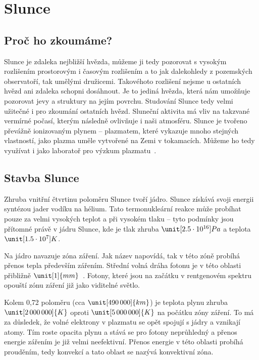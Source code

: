 \chapter{Slunce}

\section{Proč ho zkoumáme?}
Slunce je zdaleka nejbližší hvězda, můžeme ji tedy pozorovat s vysokým rozlišením prostorovým i časovým rozlišením a to jak dalekohledy z pozemských observatoří, tak umělými družicemi. Takovéhoto rozlišení nejsme u ostatních hvězd ani zdaleka schopni dosáhnout. Je to jediná hvězda, která nám umožňuje pozorovat jevy a struktury na jejím povrchu. Studování Slunce tedy velmi užitečné i pro zkoumání ostatních hvězd. Sluneční aktivita má vliv na takzvané vermírné počasí, kterým následně ovlivňuje i naši atmosféru.  Slunce je tvořeno převážně ionizovaným plynem – plazmatem, které vykazuje mnoho stejných vlastností, jako plazma uměle vytvořené na Zemi v tokamacích. Můžeme ho tedy využívat i jako laboratoř pro výzkum plazmatu~\cite{nasa_whysolar}.

\section{Stavba Slunce}
Zhruba vnitřní čtvrtinu poloměru Slunce tvoří jádro. Slunce získává svoji energii syntézou jader vodíku na hélium. Tato termonukleární reakce může probíhat pouze za velmi vysokých teplot a při vysokém tlaku – tyto podmínky jsou přítomné právě v jádru Slunce, kde je tlak zhruba $\unit[2.5\cdot10^{16}]{Pa}$ a teplota $\unit[1.5\cdot10^{7}]{K}$.

Na jádro navazuje zóna záření. Jak název napovídá, tak v této zóně probíhá přenos tepla především zářením. Střední volná dráha fotonu je v této oblasti přibližně $\unit[1]{mm}$~\cite{astro_hvezda}. Fotony, které jsou na začátku v rentgenovém spektru opouští zónu záření již jako viditelné světlo.

Kolem 0,72 poloměru (cca $\unit[490\,000]{km}$) je teplota plynu zhruba $\unit[2\,000\,000]{K}$ oproti $\unit[5\,000\,000]{K}$ na počátku zóny záření. To má za důsledek, že volné elektrony v plazmatu se opět spojují s jádry a vznikají atomy. Tím roste opacita plynu a stává se pro fotony neprůhledný a přenos energie zářením je již velmi neefektivní. Přenos energie v této oblasti probíhá prouděním, tedy konvekcí a tato oblast se nazývá konvektivní zóna.

